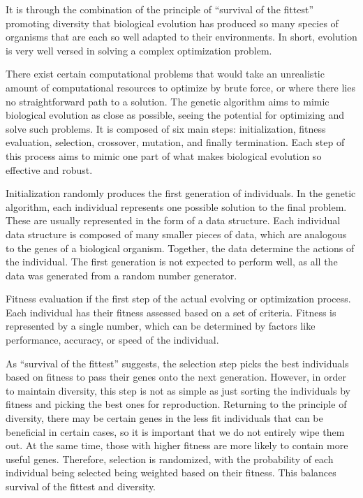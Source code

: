 \documentclass[12pt]{article}
\begin{document}
It is through the combination of the principle of ``survival of the fittest'' promoting diversity that biological evolution has produced so many species of organisms that are each so well adapted to their environments. In short, evolution is very well versed in solving a complex optimization problem.

There exist certain computational problems that would take an unrealistic amount of computational resources to optimize by brute force, or where there lies no straightforward path to a solution. The genetic algorithm aims to mimic biological evolution as close as possible, seeing the potential for optimizing and solve such problems. It is composed of six main steps: initialization, fitness evaluation, selection, crossover, mutation, and finally termination. Each step of this process aims to mimic one part of what makes biological evolution so effective and robust.

Initialization randomly produces the first generation of individuals. In the genetic algorithm, each individual represents one possible solution to the final problem. These are usually represented in the form of a data structure. Each individual data structure is composed of many smaller pieces of data, which are analogous to the genes of a biological organism. Together, the data determine the actions of the individual. The first generation is not expected to perform well, as all the data was generated from a random number generator.

Fitness evaluation if the first step of the actual evolving or optimization process. Each individual has their fitness assessed based on a set of criteria. Fitness is represented by a single number, which can be determined by factors like performance, accuracy, or speed of the individual.

As ``survival of the fittest'' suggests, the selection step picks the best individuals based on fitness to pass their genes onto the next generation. However, in order to maintain diversity, this step is not as simple as just sorting the individuals by fitness and picking the best ones for reproduction. Returning to the principle of diversity, there may be certain genes in the less fit individuals that can be beneficial in certain cases, so it is important that we do not entirely wipe them out. At the same time, those with higher fitness are more likely to contain more useful genes. Therefore, selection is randomized, with the probability of each individual being selected being weighted based on their fitness. This balances survival of the fittest and diversity.
\end{document}
